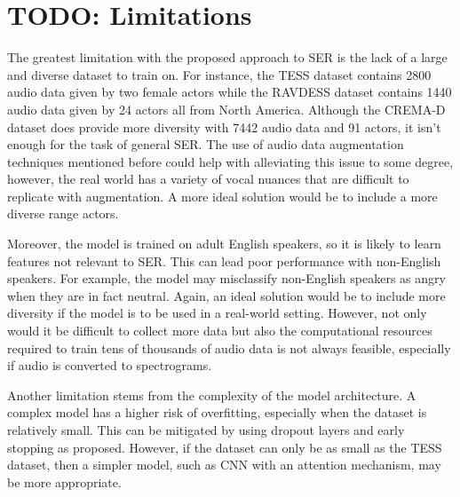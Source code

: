 \documentclass[../main.tex]{subfiles}
\begin{document}
\section{TODO: Limitations}



The greatest limitation with the proposed approach to SER is the lack of 
a large and diverse dataset to train on. For instance, the TESS dataset contains 2800 
audio data given by two female actors while the RAVDESS dataset contains
1440 audio data given by 24 actors all from North America. Although the
CREMA-D dataset does provide more diversity with 7442 audio data and 91 actors, 
it isn't enough for the task of general SER. The use of audio data augmentation
techniques mentioned before could help with alleviating this issue to 
some degree, however, the real world has a variety of vocal nuances that
are difficult to replicate with augmentation. A more ideal solution would be to 
include a more diverse range actors. 

Moreover, the model is trained on adult English speakers, so it is likely to 
learn features not relevant to SER. This can lead poor performance with 
non-English speakers. For example, the model may misclassify non-English speakers 
as angry when they are in fact neutral. Again, an ideal solution would be to 
include more diversity if the model is to be used in a real-world setting. 
However, not only would it be difficult to collect more data but also the 
computational resources required to train tens of thousands of audio data 
is not always feasible, especially if audio is converted to spectrograms.

Another limitation stems from the complexity of the model architecture. A complex 
model has a higher risk of overfitting, especially when the dataset is 
relatively small. This can be mitigated by using dropout layers and early stopping
as proposed. However, if the dataset can only be as small as the TESS dataset, then 
a simpler model, such as CNN with an attention mechanism, may be more appropriate.
\end{document}

